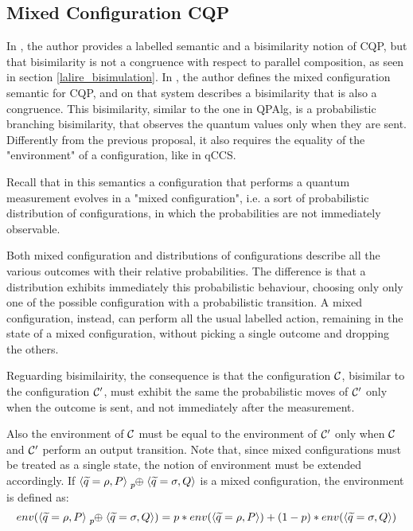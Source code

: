 \subsection{Mixed Configuration CQP}


In \cite{davidsonFormalVerificationTechniques2012}, the author provides a labelled semantic and a bisimilarity notion of CQP, but that bisimilarity is not a congruence with respect to parallel composition, as seen in section \ref{lalire_bisimulation}. In \cite{davidsonFormalVerificationTechniques2012}, the author defines the mixed configuration semantic for CQP, and on that system describes a bisimilarity that is also a congruence. This bisimilarity, similar to the one in QPAlg, is a probabilistic branching bisimilarity, that observes the quantum values only when they are sent. Differently from the previous proposal, it also requires the equality of the "environment" of a configuration, like in qCCS.


Recall that in this semantics a configuration that performs a quantum  measurement evolves in a "mixed configuration", i.e. a sort of probabilistic distribution of configurations, in which the probabilities are not immediately observable.  


Both mixed configuration and distributions of configurations describe all the various outcomes with their relative probabilities. The difference is that a distribution exhibits immediately this probabilistic behaviour, choosing only  only one of the possible configuration with a probabilistic transition. A mixed configuration, instead, can perform all the usual labelled action, remaining in the state of a mixed configuration, without picking a single outcome and dropping the others.


Reguarding bisimilairity, the consequence is that the configuration $\mathcal{C}$, bisimilar to the configuration $\mathcal{C}'$, must exhibit the same the probabilistic moves of $\mathcal{C}'$ only when the outcome is sent, and not immediately after the measurement.

Also the environment of $\mathcal{C}$ must be equal to the environment of $\mathcal{C}'$ only when $\mathcal{C}$ and $\mathcal{C}'$ perform an output transition. Note that, since mixed configurations must be treated as a single state, the notion of environment must be extended accordingly. If $\confw{\widetilde{q} = \rho, P} \psum{p} \confw{\widetilde{q} = \sigma, Q}$ is a mixed configuration, the environment is defined as:
\[env(\confw{\widetilde{q} = \rho, P} \psum{p} \confw{\widetilde{q} = \sigma, Q}) = p*env(\confw{\widetilde{q} = \rho, P}) + (1-p)*env(\confw{\widetilde{q} = \sigma, Q})\]

